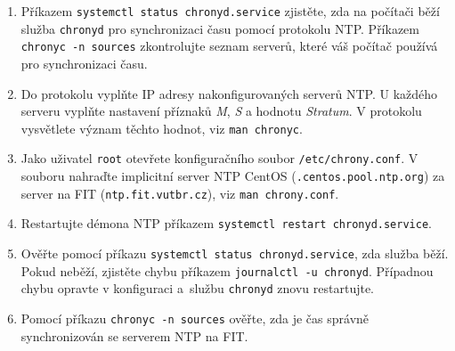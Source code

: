 \documentclass[a4paper,11pt]{article}
\begin{document}
\begin{enumerate}
  \item Příkazem {\tt systemctl status chronyd.service} zjistěte, zda na počítači běží služba \texttt{chronyd} pro synchronizaci času pomocí protokolu NTP. Příkazem {\tt chronyc -n sources} zkontrolujte seznam serverů, které váš počítač používá
    pro synchronizaci času.

  \item Do protokolu vyplňte IP adresy nakonfigurovaných serverů NTP. 
  U každého serveru vyplňte nastavení příznaků {\em M}, {\em S} a hodnotu {\em Stratum}.
  V protokolu vysvětlete význam těchto hodnot, viz \texttt{man chronyc}.

  \item Jako uživatel \texttt{root} otevřete konfiguračního soubor {\tt /etc/chrony.conf}. V souboru
    nahraďte implicitní server NTP CentOS ({\tt *.centos.pool.ntp.org}) za server na FIT ({\tt ntp.fit.vutbr.cz}), viz {\tt man chrony.conf}.  
  \item Restartujte démona NTP příkazem {\tt systemctl restart chronyd.service}.
  \item Ověřte pomocí příkazu {\tt systemctl status chronyd.service}, zda služba běží. Pokud neběží, zjistěte chybu příkazem {\tt journalctl -u chronyd}. Případnou chybu opravte v konfiguraci a~službu {\tt chronyd} znovu restartujte.
  \item Pomocí příkazu {\tt chronyc -n sources} ověřte, zda je čas správně synchronizován se serverem NTP na FIT.

\end{enumerate}
\end{document}

